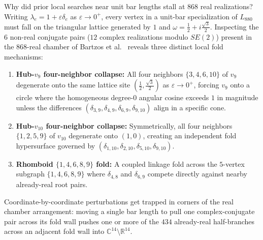 \documentclass[11pt,a4paper]{article}
\theoremstyle{definition}
\theoremstyle{remark}
\begin{document}
Why did prior local searches near unit bar lengths stall at $868$ real realizations? Writing $\lambda_e = 1 + \varepsilon \delta_e$ as $\varepsilon \to 0^+$, every vertex in a unit-bar specialization of $L_{880}$ must fall on the triangular lattice generated by $1$ and $\omega = \frac{1}{2} + i\frac{\sqrt{3}}{2}$. Inspecting the $6$ non-real conjugate pairs ($12$ complex realizations modulo $SE(2)$) present in the $868$-real chamber of Bartzos et al.\ \cite[p.~16]{BELT18} reveals three distinct local fold mechanisms:
\begin{enumerate}
\setlength{\itemsep}{2pt}
\item \textbf{Hub-$v_9$ four-neighbor collapse:} All four neighbors $\{3,4,6,10\}$ of $v_9$ degenerate onto the same lattice site $(\frac{1}{2}, \frac{\sqrt{3}}{2})$ as $\varepsilon \to 0^+$, forcing $v_9$ onto a circle where the homogeneous degree-$0$ angular cosine exceeds $1$ in magnitude unless the differences $(\delta_{3,9}, \delta_{4,9}, \delta_{6,9}, \delta_{9,10})$ align in a specific cone.
\item \textbf{Hub-$v_{10}$ four-neighbor collapse:} Symmetrically, all four neighbors $\{1,2,5,9\}$ of $v_{10}$ degenerate onto $(1,0)$, creating an independent fold hypersurface governed by $(\delta_{1,10}, \delta_{2,10}, \delta_{5,10}, \delta_{9,10})$.
\item \textbf{Rhomboid $\{1,4,6,8,9\}$ fold:} A coupled linkage fold across the $5$-vertex subgraph $\{1,4,6,8,9\}$ where $\delta_{4,8}$ and $\delta_{6,9}$ compete directly against nearby already-real root pairs.
\end{enumerate}

Coordinate-by-coordinate perturbations get trapped in corners of the real chamber arrangement: moving a single bar length to pull one complex-conjugate pair across its fold wall pushes one or more of the $434$ already-real half-branches across an adjacent fold wall into $\mathbb{C}^{14} \setminus \mathbb{R}^{14}$.
\end{document}
